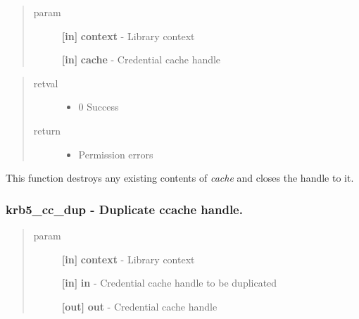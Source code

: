 \documentclass[letterpaper,10pt,english]{sphinxmanual}
\begin{document}
\begin{quote}\begin{description}
\item[{param}] \leavevmode
\textbf{{[}in{]}} \textbf{context} - Library context

\textbf{{[}in{]}} \textbf{cache} - Credential cache handle

\end{description}\end{quote}
\begin{quote}\begin{description}
\item[{retval}] \leavevmode\begin{itemize}
\item {} 
0   Success

\end{itemize}

\item[{return}] \leavevmode\begin{itemize}
\item {} 
Permission errors

\end{itemize}

\end{description}\end{quote}

This function destroys any existing contents of \emph{cache} and closes the handle to it.


\subsubsection{krb5\_cc\_dup -  Duplicate ccache handle.}
\label{appdev/refs/api/krb5_cc_dup:krb5-cc-dup-duplicate-ccache-handle}\label{appdev/refs/api/krb5_cc_dup::doc}

\begin{fulllineitems}
\label{appdev/refs/api/krb5_cc_dup:krb5_cc_dup}
\end{fulllineitems}

\begin{quote}\begin{description}
\item[{param}] \leavevmode
\textbf{{[}in{]}} \textbf{context} - Library context

\textbf{{[}in{]}} \textbf{in} - Credential cache handle to be duplicated

\textbf{{[}out{]}} \textbf{out} - Credential cache handle

\end{description}\end{quote}
\end{document}
